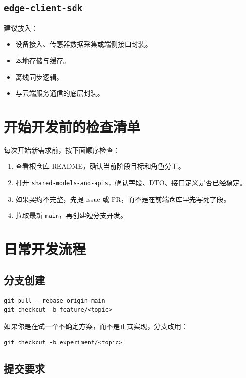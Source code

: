 \documentclass[11pt,a4paper]{ctexart}
\begin{document}
\subsection{\texttt{edge-client-sdk}}

建议放入：

\begin{itemize}
  \item 设备接入、传感器数据采集或端侧接口封装。
  \item 本地存储与缓存。
  \item 离线同步逻辑。
  \item 与云端服务通信的底层封装。
\end{itemize}

\section{开始开发前的检查清单}

每次开始新需求前，按下面顺序检查：

\begin{enumerate}
  \item 查看根仓库 README，确认当前阶段目标和角色分工。
  \item 打开 \texttt{shared-models-and-apis}，确认字段、DTO、接口定义是否已经稳定。
  \item 如果契约不完整，先提 issue 或 PR，而不是在前端仓库里先写死字段。
  \item 拉取最新 \texttt{main}，再创建短分支开发。
\end{enumerate}

\section{日常开发流程}

\subsection{分支创建}

\begin{verbatim}
git pull --rebase origin main
git checkout -b feature/<topic>
\end{verbatim}

如果你是在试一个不确定方案，而不是正式实现，分支改用：

\begin{verbatim}
git checkout -b experiment/<topic>
\end{verbatim}

\subsection{提交要求}
\end{document}
